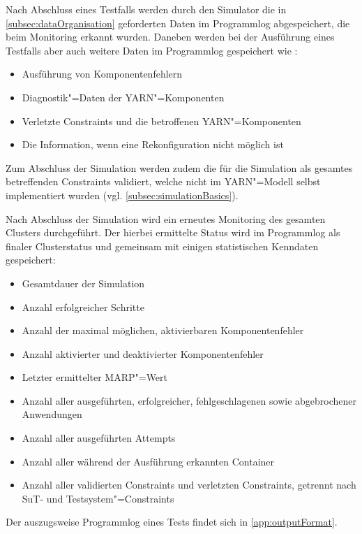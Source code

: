 Nach Abschluss eines Testfalls werden durch den Simulator die in \cref{subsec:dataOrganisation} geforderten Daten im Programmlog abgespeichert, die beim Monitoring erkannt wurden.
Daneben werden bei der Ausführung eines Testfalls aber auch weitere Daten im Programmlog gespeichert wie \zB:

\begin{itemize}
    \item Ausführung von Komponentenfehlern
    \item Diagnostik"=Daten der YARN"=Komponenten
    \item Verletzte Constraints und die betroffenen YARN"=Komponenten
    \item Die Information, wenn eine Rekonfiguration nicht möglich ist
\end{itemize}

Zum Abschluss der Simulation werden zudem die für die Simulation als gesamtes betreffenden Constraints validiert, welche nicht im YARN"=Modell selbst implementiert wurden (vgl. \cref{subsec:simulationBasics}).

Nach Abschluss der Simulation wird ein erneutes Monitoring des gesamten Clusters durchgeführt.
Der hierbei ermittelte Status wird im Programmlog als finaler Clusterstatus und gemeinsam mit einigen statistischen Kenndaten gespeichert:

\begin{itemize}
    \item Gesamtdauer der Simulation
    \item Anzahl erfolgreicher Schritte
    \item Anzahl der maximal möglichen, aktivierbaren Komponentenfehler
    \item Anzahl aktivierter und deaktivierter Komponentenfehler
    \item Letzter ermittelter \gls{MARP}"=Wert
    \item Anzahl aller ausgeführten, erfolgreicher, fehlgeschlagenen sowie abgebrochener Anwendungen
    \item Anzahl aller ausgeführten Attempts
    \item Anzahl aller während der Ausführung erkannten Container
    \item Anzahl aller validierten Constraints und verletzten Constraints, getrennt nach \gls{SuT}- und Testsystem"=Constraints
\end{itemize}

Der auszugsweise Programmlog eines Tests findet sich in \cref{app:outputFormat}.